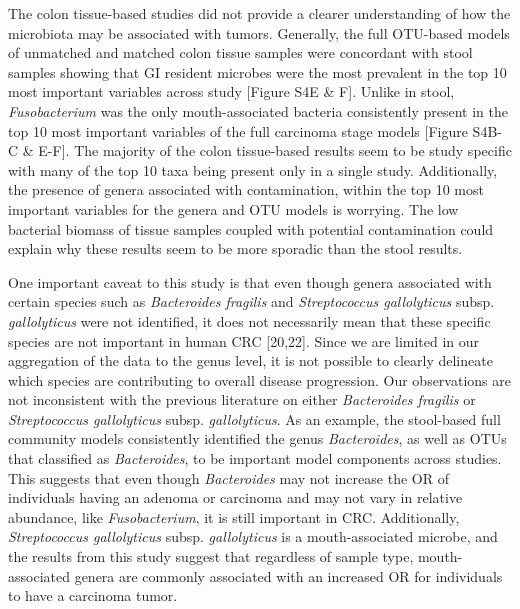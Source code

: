 \documentclass[12pt,]{article}
\begin{document}
The colon tissue-based studies did not provide a clearer understanding
of how the microbiota may be associated with tumors. Generally, the full
OTU-based models of unmatched and matched colon tissue samples were
concordant with stool samples showing that GI resident microbes were the
most prevalent in the top 10 most important variables across study
{[}Figure S4E \& F{]}. Unlike in stool, \emph{Fusobacterium} was the
only mouth-associated bacteria consistently present in the top 10 most
important variables of the full carcinoma stage models {[}Figure S4B-C
\& E-F{]}. The majority of the colon tissue-based results seem to be
study specific with many of the top 10 taxa being present only in a
single study. Additionally, the presence of genera associated with
contamination, within the top 10 most important variables for the genera
and OTU models is worrying. The low bacterial biomass of tissue samples
coupled with potential contamination could explain why these results
seem to be more sporadic than the stool results.

One important caveat to this study is that even though genera associated
with certain species such as \emph{Bacteroides fragilis} and
\emph{Streptococcus gallolyticus} subsp. \emph{gallolyticus} were not
identified, it does not necessarily mean that these specific species are
not important in human CRC {[}20,22{]}. Since we are limited in our
aggregation of the data to the genus level, it is not possible to
clearly delineate which species are contributing to overall disease
progression. Our observations are not inconsistent with the previous
literature on either \emph{Bacteroides fragilis} or \emph{Streptococcus
gallolyticus} subsp. \emph{gallolyticus}. As an example, the stool-based
full community models consistently identified the genus
\emph{Bacteroides}, as well as OTUs that classified as
\emph{Bacteroides}, to be important model components across studies.
This suggests that even though \emph{Bacteroides} may not increase the
OR of individuals having an adenoma or carcinoma and may not vary in
relative abundance, like \emph{Fusobacterium}, it is still important in
CRC. Additionally, \emph{Streptococcus gallolyticus} subsp.
\emph{gallolyticus} is a mouth-associated microbe, and the results from
this study suggest that regardless of sample type, mouth-associated
genera are commonly associated with an increased OR for individuals to
have a carcinoma tumor.
\end{document}
